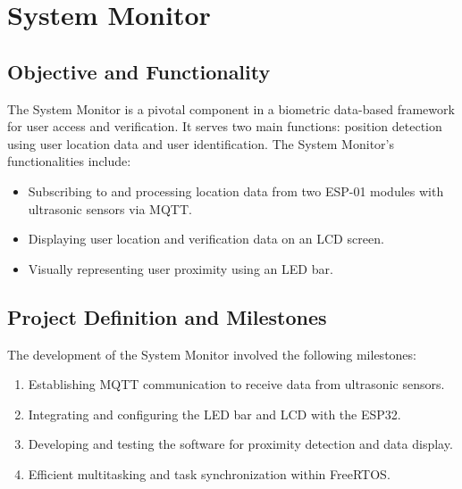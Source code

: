 \documentclass{article}
\begin{document}
\section{System Monitor}

\subsection{Objective and Functionality}
The System Monitor is a pivotal component in a biometric data-based framework for user access and verification. It serves two main functions: position detection using user location data and user identification. The System Monitor's functionalities include:
\begin{itemize}
    \item Subscribing to and processing location data from two ESP-01 modules with ultrasonic sensors via MQTT.
    \item Displaying user location and verification data on an LCD screen.
    \item Visually representing user proximity using an LED bar.
\end{itemize}

\subsection{Project Definition and Milestones}
The development of the System Monitor involved the following milestones:
\begin{enumerate}
    \item Establishing MQTT communication to receive data from ultrasonic sensors.
    \item Integrating and configuring the LED bar and LCD with the ESP32.
    \item Developing and testing the software for proximity detection and data display.
    \item Efficient multitasking and task synchronization within FreeRTOS.
\end{enumerate}
\end{document}
